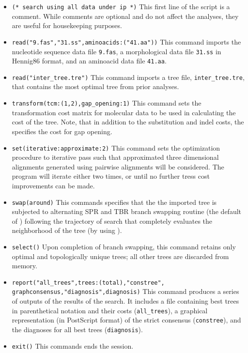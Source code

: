 \begin{itemize}
\item \texttt{(* search using all data under ip *)} This first line of the script is a comment. While comments are 
optional and do not affect the analyses, they are useful for housekeeping purposes.
\item \texttt{read("9.fas","31.ss",aminoacids:("41.aa"))} This command imports the nucleotide sequence 
data file \texttt{9.fas}, a morphological data file \texttt{31.ss} in Hennig86 format, 
and an aminoacid data file \texttt{41.aa}.
\item \texttt{read("inter\_tree.tre")} This command imports a tree file, \texttt{inter\_tree.tre}, that contains the most 
optimal tree from prior analyses. 
\item \texttt{transform(tcm:(1,2),gap\_opening:1)} This command sets the transformation cost matrix for molecular 
data to be used in calculating the cost of the tree. Note, that in addition to the substitution and indel costs, the 
 specifies the cost for gap opening.
\item \texttt{set(iterative:approximate:2)} This command sets the optimization procedure
    to iterative pass such that approximated three dimensional alignments generated using pairwise alignments 
    will be considered.  The program will iterate either two times, or until no further tress cost improvements can 
    be made.
\item \texttt{swap(around)} This commands specifies that the the imported tree is subjected to alternating SPR 
and TBR branch swapping routine (the default of \poy) following the trajectory of search that completely 
evaluates the neighborhood of the tree (by using ).
\item \texttt{select()} Upon completion of branch swapping, this command retains only optimal and topologically 
unique trees; all other trees are discarded from memory.
\item \texttt{report("all\_trees",trees:(total),"constree",\\graphconsensus,"diagnosis",diagnosis)} This command 
produces a series of outputs of the results of the search. It includes a file containing best trees in parenthetical 
notation and their costs (\texttt{all\_trees}), a graphical representation (in PostScript format) of the strict 
consensus (\texttt{constree}), and the diagnoses for all best trees (\texttt{diagnosis}).
\item \texttt{exit()} This commands ends the \poy session.
\end{itemize}

